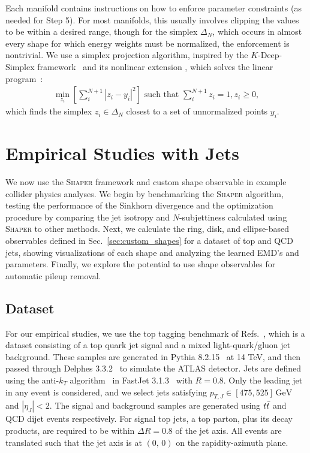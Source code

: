 \documentclass[letterpaper,11pt]{article}
\DeclareRobustCommand{\Sec}[1]{Sec.~\ref{sec:#1}}
\DeclareRobustCommand{\Refers}[1]{Refs.~\cite{#1}}
\def\GeV{\text{GeV}}
\newcommand{\FastJet}{{\sc FastJet}\xspace}
\newcommand{\Shaper}{\textsc{Shaper}\xspace}
\begin{document}
Each manifold contains instructions on how to enforce parameter constraints (as needed for Step 5). For most manifolds, this usually involves clipping the values to be within a desired range, though for the simplex $\Delta_N$, which occurs in almost every shape for which energy weights must be normalized, the enforcement is nontrivial. We use a simplex projection algorithm, inspired by the $K$-Deep-Simplex framework~\cite{tankala2020k} and its nonlinear extension \cite{mueller2022geometric}, which solves the linear program~\cite{https://doi.org/10.48550/arxiv.1309.1541}:
%
\begin{align}
    \min_{z_i}\left[\sum_i^{N+1}|z_i-y_i|^2\right] \text{ such that } \sum_i^{N+1} z_i = 1, z_i \geq 0,
\end{align}
%
which finds the simplex $z_i \in \Delta_N$ closest to a set of unnormalized points $y_i$.  





\section{Empirical Studies with Jets}\label{sec:empirical}

We now use the \Shaper framework and custom shape observable in example collider physics analyses.
%
We begin by benchmarking the \Shaper algorithm, testing the performance of the Sinkhorn divergence and the optimization procedure by comparing the jet isotropy and $N$-subjettiness calculated using \Shaper to other methods.
%
Next, we calculate the ring, disk, and ellipse-based observables defined in \Sec{custom_shapes} for a dataset of top and QCD jets, showing visualizations of each shape and analyzing the learned EMD's and parameters. Finally, we explore the potential to use shape observables for automatic pileup removal.

\subsection{Dataset}\label{sec:dataset}


For our empirical studies, we use the top tagging benchmark of \Refers{Butter:2017cot,Kasieczka:2019dbj}, which is a dataset consisting of a top quark jet signal and a mixed light-quark/gluon jet background. These samples are generated in {\sc Pythia} 8.2.15~\cite{Sjostrand:2014zea} at 14 TeV, and then passed through {\sc Delphes} 3.3.2~\cite{deFavereau:2013fsa} to simulate the ATLAS detector. Jets are defined using the anti-$k_T$ algorithm~\cite{Cacciari:2008gp} in \FastJet 3.1.3~\cite{Cacciari:2011ma} with $R = 0.8$. Only the leading jet in any event is considered, and we select jets satisfying $p_{T,J} \in [475,525]\,\GeV$ and $|\eta_J| < 2$. The signal and background samples are generated using $t\Bar{t}$ and QCD dijet events respectively. For signal top jets, a top parton, plus its decay products, are required to be within $\Delta R = 0.8$ of the jet axis. All events are translated such that the jet axis is at $(0,\,0)$ on the rapidity-azimuth plane.
\end{document}
